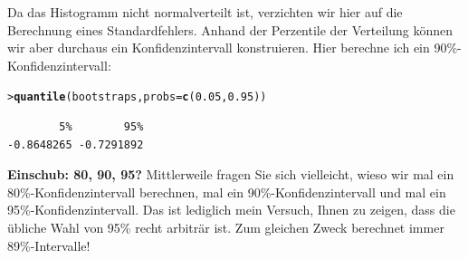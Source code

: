 \documentclass[oneside, 10pt]{book}\usepackage[]{graphicx}\usepackage[]{xcolor}
\makeatletter
\newcommand{\hlnum}[1]{\textcolor[rgb]{0.686,0.059,0.569}{#1}}%
\newcommand{\hlstd}[1]{\textcolor[rgb]{0.345,0.345,0.345}{#1}}%
\newcommand{\hlkwc}[1]{\textcolor[rgb]{0.333,0.667,0.333}{#1}}%
\newcommand{\hlkwd}[1]{\textcolor[rgb]{0.737,0.353,0.396}{\textbf{#1}}}%
\newenvironment{kframe}{%
 \def\at@end@of@kframe{}%
 \ifinner\ifhmode%
  \def\at@end@of@kframe{\end{minipage}}%
  \begin{minipage}{\columnwidth}%
 \fi\fi%
 \def\FrameCommand##1{\hskip\@totalleftmargin \hskip-\fboxsep
 \colorbox{shadecolor}{##1}\hskip-\fboxsep
     \hskip-\linewidth \hskip-\@totalleftmargin \hskip\columnwidth}%
 \MakeFramed {\advance\hsize-\width
   \@totalleftmargin\z@ \linewidth\hsize
   \@setminipage}}%
 {\par\unskip\endMakeFramed%
 \at@end@of@kframe}
\newenvironment{knitrout}{}{} %
\makeatother
\begin{document}
Da das Histogramm nicht normalverteilt ist, verzichten
wir hier auf die Berechnung eines Standardfehlers.
Anhand der Perzentile der Verteilung können wir aber durchaus
ein Konfidenzintervall konstruieren. Hier berechne ich
ein 90\%-Konfidenzintervall:
\begin{knitrout}
\color{fgcolor}\begin{kframe}
\begin{alltt}
\hlstd{> }\hlkwd{quantile}\hlstd{(bootstraps,} \hlkwc{probs} \hlstd{=} \hlkwd{c}\hlstd{(}\hlnum{0.05}\hlstd{,} \hlnum{0.95}\hlstd{))}
\end{alltt}
\begin{verbatim}
        5%        95% 
-0.8648265 -0.7291892 
\end{verbatim}
\end{kframe}
\end{knitrout}

\medskip
\begin{framed}
\noindent \textbf{Einschub: 80, 90, 95?}
Mittlerweile fragen Sie sich vielleicht, wieso wir
mal ein 80\%-Konfidenzintervall berechnen,
mal ein 90\%-Konfidenzintervall und mal ein
95\%-Konfidenzintervall. Das ist lediglich mein
Versuch, Ihnen zu zeigen, dass die übliche Wahl von
95\% recht arbiträr ist. Zum gleichen Zweck
berechnet \citet{McElreath2020} immer 89\%-Intervalle!
\end{framed}
\end{document}
